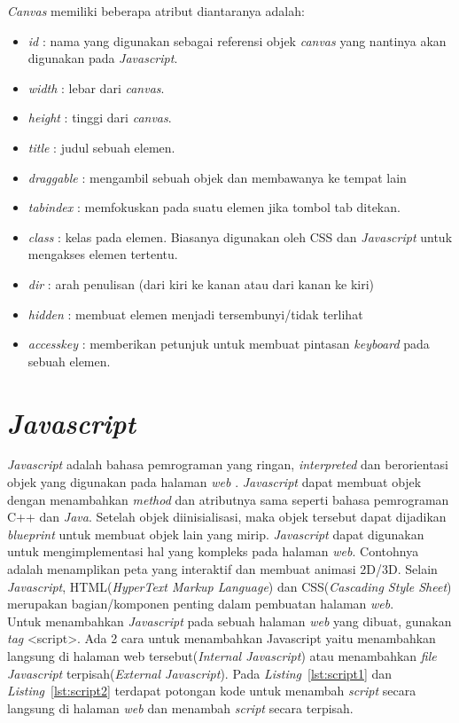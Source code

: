 \textit{Canvas} memiliki beberapa atribut diantaranya adalah: 
\begin{itemize}
	\item \textit{id} : nama yang digunakan sebagai referensi objek \textit{canvas} yang nantinya akan digunakan pada \textit{Javascript}.
	\item \textit{width} : lebar dari \textit{canvas}.
	\item \textit{height} : tinggi dari \textit{canvas}.
	\item \textit{title} : judul sebuah elemen.
	\item \textit{draggable} : mengambil sebuah objek dan membawanya ke tempat lain
	\item \textit{tabindex} : memfokuskan pada suatu elemen jika tombol tab ditekan.
	\item \textit{class} : kelas pada elemen. Biasanya digunakan oleh CSS dan \textit{Javascript} untuk mengakses elemen tertentu.
	\item \textit{dir} : arah penulisan (dari kiri ke kanan atau dari kanan ke kiri)
	\item \textit{hidden} : membuat elemen menjadi tersembunyi/tidak terlihat
	\item \textit{accesskey} : memberikan petunjuk untuk membuat pintasan \textit{keyboard} pada sebuah elemen.
\end{itemize}


\section{\textit{Javascript}}
\label{sec:Javascript}
\textit{Javascript} adalah bahasa pemrograman yang ringan, \textit{interpreted} dan berorientasi objek yang digunakan pada halaman \textit{web} \cite{MDN:05:Web}. \textit{Javascript} dapat membuat objek dengan menambahkan \textit{method} dan atributnya sama seperti bahasa pemrograman C++ dan \textit{Java}. Setelah objek diinisialisasi, maka objek tersebut dapat dijadikan \textit{blueprint} untuk membuat objek lain yang mirip. \textit{Javascript} dapat digunakan untuk mengimplementasi hal yang kompleks pada halaman \textit{web}. Contohnya adalah menamplikan peta yang interaktif dan membuat animasi 2D/3D. Selain \textit{Javascript}, HTML(\textit{HyperText Markup Language}) dan CSS(\textit{Cascading Style Sheet}) merupakan bagian/komponen penting dalam pembuatan halaman \textit{web}.\\

Untuk menambahkan \textit{Javascript} pada sebuah halaman \textit{web} yang dibuat, gunakan \textit{tag} <script>. Ada 2 cara untuk menambahkan Javascript yaitu menambahkan langsung di halaman web tersebut(\textit{Internal Javascript}) atau menambahkan \textit{file Javascript} terpisah(\textit{External Javascript}). Pada \textit{Listing}~\ref{lst:script1} dan \textit{Listing}~\ref{lst:script2} terdapat potongan kode untuk menambah \textit{script} secara langsung di halaman \textit{web} dan menambah \textit{script} secara terpisah.

